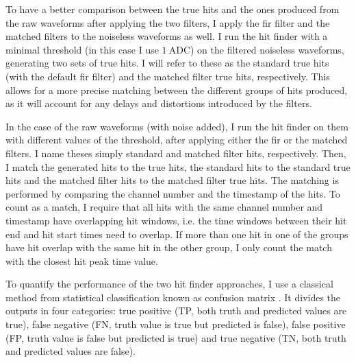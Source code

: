 To have a better comparison between the true hits and the ones produced from the raw waveforms after applying the two filters, I apply the \gls{fir} filter and the matched filters to the noiseless waveforms as well. I run the hit finder with a minimal threshold (in this case I use $1 \ \mathrm{ADC}$) on the filtered noiseless waveforms, generating two sets of true hits. I will refer to these as the standard true hits (with the default \gls{fir} filter) and the matched filter true hits, respectively. This allows for a more precise matching between the different groups of hits produced, as it will account for any delays and distortions introduced by the filters.

In the case of the raw waveforms (with noise added), I run the hit finder on them with different values of the threshold, after applying either the \gls{fir} or the matched filters. I name theses simply standard and matched filter hits, respectively. Then, I match the generated hits to the true hits, the standard hits to the standard true hits and the matched filter hits to the matched filter true hits. The matching is performed by comparing the channel number and the timestamp of the hits. To count as a match, I require that all hits with the same channel number and timestamp have overlapping hit windows, i.e. the time windows between their hit end and hit start times need to overlap. If more than one hit in one of the groups have hit overlap with the same hit in the other group, I only count the match with the closest hit peak time value.

To quantify the performance of the two hit finder approaches, I use a classical method from statistical classification known as confusion matrix \cite{Stehman1997}. It divides the outputs in four categories: true positive (TP, both truth and predicted values are true), false negative (FN, truth value is true but predicted is false), false positive (FP, truth value is false but predicted is true) and true negative (TN, both truth and predicted values are false).

